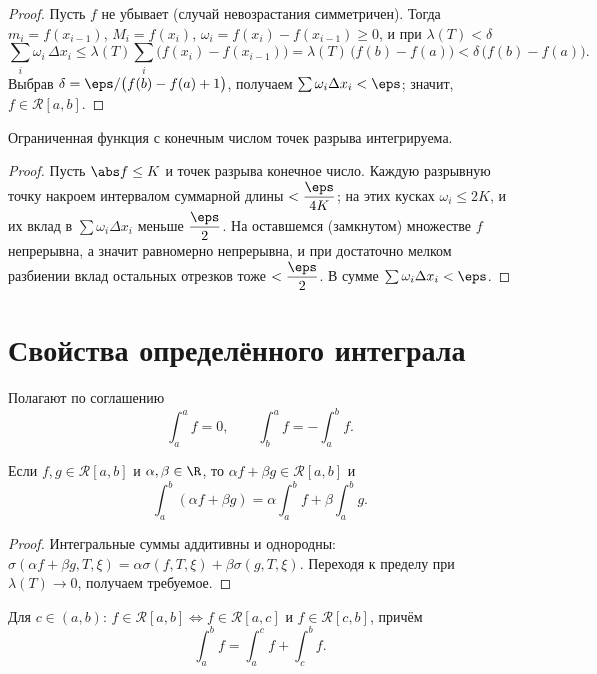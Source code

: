 \begin{proof}
Пусть $f$ не убывает (случай невозрастания симметричен). Тогда $m_i=f(x_{i-1})$, $M_i=f(x_i)$,
$\omega_i=f(x_i)-f(x_{i-1})\ge0$, и при $\lambda(T)<\delta$
\[
  \sum_i\omega_i\,\Delta x_i\le\lambda(T)\sum_i\bigl(f(x_i)-f(x_{i-1})\bigr)
   =\lambda(T)\,\bigl(f(b)-f(a)\bigr)<\delta\,\bigl(f(b)-f(a)\bigr).
\]
Выбрав $\delta=\eps/\bigl(f(b)-f(a)+1\bigr)$, получаем $\sum\omega_i\Delta x_i<\eps$; значит,
$f\in\mathcal R[a,b]$.
\end{proof}

\begin{theorem}
Ограниченная функция с конечным числом точек разрыва интегрируема.
\end{theorem}

\begin{proof}
Пусть $\abs f\le K$ и точек разрыва конечное число. Каждую разрывную точку накроем интервалом
суммарной длины $<\dfrac{\eps}{4K}$; на этих кусках $\omega_i\le2K$, и их вклад в
$\sum\omega_i\Delta x_i$ меньше $\dfrac\eps2$. На оставшемся (замкнутом) множестве $f$ непрерывна,
а значит равномерно непрерывна, и при достаточно мелком разбиении вклад остальных отрезков тоже
$<\dfrac\eps2$. В сумме $\sum\omega_i\Delta x_i<\eps$.
\end{proof}

\section{Свойства определённого интеграла}

Полагают по соглашению
\[
  \int_a^a f=0,\qquad \int_b^a f=-\int_a^b f .
\]

\begin{property}[линейность]
Если $f,g\in\mathcal R[a,b]$ и $\alpha,\beta\in\R$, то $\alpha f+\beta g\in\mathcal R[a,b]$ и
\[
  \int_a^b(\alpha f+\beta g)=\alpha\!\int_a^b f+\beta\!\int_a^b g .
\]
\end{property}

\begin{proof}
Интегральные суммы аддитивны и однородны: $\sigma(\alpha f+\beta g,T,\xi)=\alpha\sigma(f,T,\xi)
+\beta\sigma(g,T,\xi)$. Переходя к пределу при $\lambda(T)\to0$, получаем требуемое.
\end{proof}

\begin{property}
Для $c\in(a,b)$: $f\in\mathcal R[a,b]\iff f\in\mathcal R[a,c]$ и $f\in\mathcal R[c,b]$, причём
\[
  \int_a^b f=\int_a^c f+\int_c^b f .
\]
\end{property}

